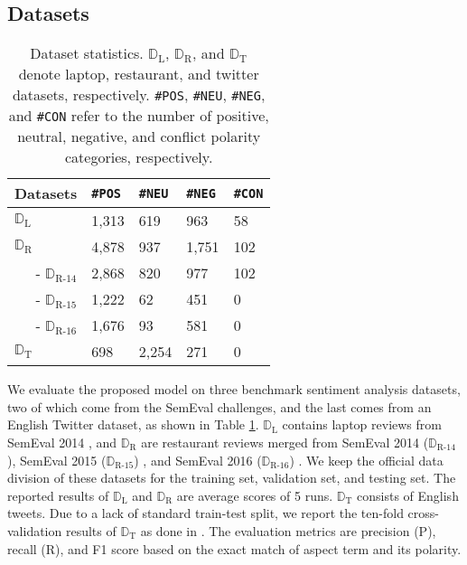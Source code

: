 \documentclass[11pt,a4paper]{article}
\begin{document}
\subsection{Datasets}
\begin{table}[tp]
\small
\begin{center}
    \begin{tabular}{|l|l|l|l|l|}
    \hline
    Datasets & \texttt{\#POS} & \texttt{\#NEU} & \texttt{\#NEG} & \texttt{\#CON} \\ \hline \hline
    $\mathbb{D}_\text{L}$       & 1,313 & 619   & 963   & 58    \\ \hline
    $\mathbb{D}_\text{R}$       & 4,878 & 937 & 1,751 & 102 \\
    \multicolumn{1}{|r|}{- $\mathbb{D}_\text{R-14}$}   & 2,868 & 820 & 977 & 102 \\
    \multicolumn{1}{|r|}{- $\mathbb{D}_\text{R-15}$}   & 1,222 & 62  & 451 & 0   \\
    \multicolumn{1}{|r|}{- $\mathbb{D}_\text{R-16}$}   & 1,676 & 93  & 581 & 0   \\ \hline
    $\mathbb{D}_\text{T}$       & 698      & 2,254 & 271 & 0 \\ \hline
    \end{tabular}
\end{center}
\caption{\label{table_datasets} Dataset statistics. $\mathbb{D}_\text{L}$, $\mathbb{D}_\text{R}$, and $\mathbb{D}_\text{T}$ denote laptop, restaurant, and twitter datasets, respectively. \texttt{\#POS}, \texttt{\#NEU}, \texttt{\#NEG}, and \texttt{\#CON} refer to the number of positive, neutral, negative, and conflict polarity categories, respectively.}
\end{table}
We evaluate the proposed model on three benchmark sentiment analysis datasets, two of which come from the SemEval challenges, and the last comes from an English Twitter dataset, as shown in Table \ref{table_datasets}. $\mathbb{D}_\text{L}$ contains laptop reviews from SemEval 2014 \cite{Pontiki2014}, and $\mathbb{D}_\text{R}$ are restaurant reviews merged from SemEval 2014 ($\mathbb{D}_\text{R-14}$), SemEval 2015 ($\mathbb{D}_\text{R-15}$) \cite{Pontiki2015}, and SemEval 2016 ($\mathbb{D}_\text{R-16}$) \cite{Pontiki2016}. We keep the official data division of these datasets for the training set, validation set, and testing set. The reported results of $\mathbb{D}_\text{L}$ and $\mathbb{D}_\text{R}$ are average scores of 5 runs. $\mathbb{D}_\text{T}$ consists of English tweets. Due to a lack of standard train-test split, we report the ten-fold cross-validation results of $\mathbb{D}_\text{T}$ as done in \cite{Li2019a,Luo2019}. The evaluation metrics are precision (P), recall (R), and F1 score based on the exact match of aspect term and its polarity.
\end{document}
